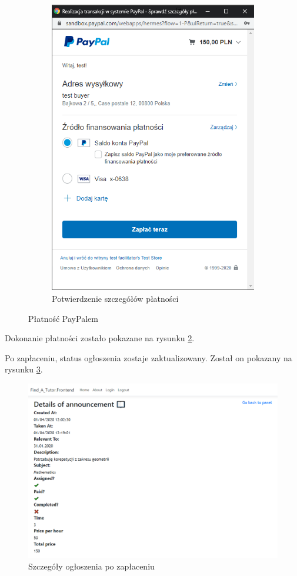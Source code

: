 \documentclass[12pt]{article}
\numberwithin{figure}{section}
\begin{document}
\begin{sloppypar}
\begin{figure}[h]
\begin{subfigure}{.5\textwidth}
      \includegraphics[width=.9\linewidth]{images/chapter_4/pay2.png}
      \caption{Potwierdzenie szczegółów płatności}
      \label{fig:paypal2}
    \end{subfigure}
    \caption{Płatność PayPalem}
    \label{fig:paypal}
\end{figure}

Dokonanie płatności zostało pokazane na rysunku \ref{fig:paypal}.

Po zapłaceniu, status ogłoszenia zostaje zaktualizowany. Został on pokazany na rysunku \ref{fig:details-paid}.
\begin{figure}[!htbp] 
    \centering
    \includegraphics[width=1\textwidth]{images/chapter_4/details-paid.png}
    \caption{Szczegóły ogłoszenia po zapłaceniu}
    \label{fig:details-paid}
\end{figure}


\end{sloppypar}
\end{document}
